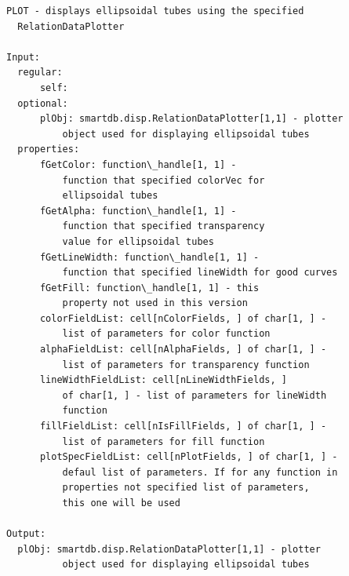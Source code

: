 \documentclass[letterpaper,10pt,english]{sphinxmanual}
\begin{document}
\begin{Verbatim}[commandchars=\\\{\}]
PLOT - displays ellipsoidal tubes using the specified
  RelationDataPlotter

Input:
  regular:
      self:
  optional:
      plObj: smartdb.disp.RelationDataPlotter[1,1] - plotter
          object used for displaying ellipsoidal tubes
  properties:
      fGetColor: function\_handle[1, 1] -
          function that specified colorVec for
          ellipsoidal tubes
      fGetAlpha: function\_handle[1, 1] -
          function that specified transparency
          value for ellipsoidal tubes
      fGetLineWidth: function\_handle[1, 1] -
          function that specified lineWidth for good curves
      fGetFill: function\_handle[1, 1] - this
          property not used in this version
      colorFieldList: cell[nColorFields, ] of char[1, ] -
          list of parameters for color function
      alphaFieldList: cell[nAlphaFields, ] of char[1, ] -
          list of parameters for transparency function
      lineWidthFieldList: cell[nLineWidthFields, ]
          of char[1, ] - list of parameters for lineWidth
          function
      fillFieldList: cell[nIsFillFields, ] of char[1, ] -
          list of parameters for fill function
      plotSpecFieldList: cell[nPlotFields, ] of char[1, ] -
          defaul list of parameters. If for any function in
          properties not specified list of parameters,
          this one will be used

Output:
  plObj: smartdb.disp.RelationDataPlotter[1,1] - plotter
          object used for displaying ellipsoidal tubes
\end{Verbatim}
\end{document}
